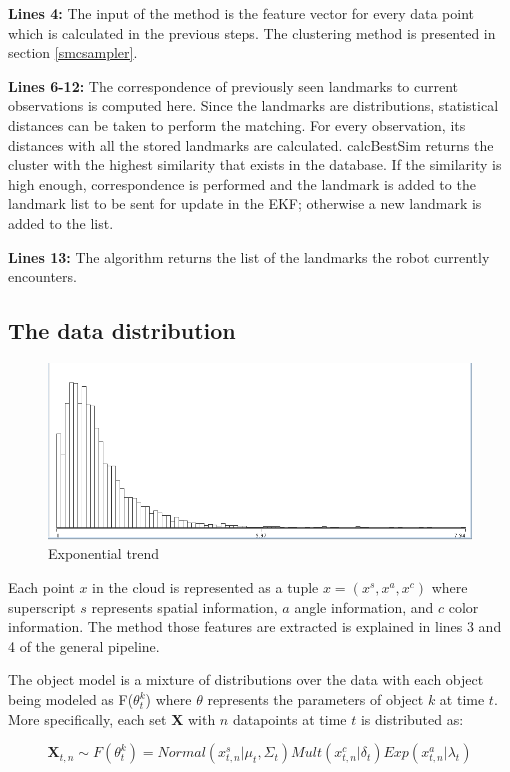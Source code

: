 \documentclass[twoside,hidelinks]{article}
\begin{document}
\textbf{Lines 4:} The input of the method is the feature vector for every data point which is calculated in the previous steps. The clustering method is presented in section \ref{smcsampler}. 

\textbf{Lines 6-12:} The correspondence of previously seen landmarks to current observations is computed here. Since the landmarks are distributions, statistical distances can be taken to perform the matching. For every observation, its distances with all the stored landmarks are calculated. calcBestSim returns the cluster with the highest similarity that exists in the database. If the similarity is high enough, correspondence is performed and the landmark is added to the landmark list to be sent for update in the EKF; otherwise a new landmark is added to the list.

\textbf{Lines 13:} The algorithm returns the list of the landmarks the robot currently encounters.

\subsection{The data distribution}
\label{data:dist}

\begin{figure}
    \centering
    \includegraphics[width=.35\textwidth]{Kullback-Leibler}
    \caption{Exponential trend}
    \label{pcl:kl}
\end{figure}

Each point $x$ in the cloud is represented as a tuple $x =(x^s, x^a, x^c ) $ where superscript $s$ represents spatial information, $a$ angle information, and $c$ color information. The method those features are extracted is explained in lines 3 and 4 of the general pipeline.

The object model is a mixture of distributions over the data with each object being modeled as F($\theta_t^k$) where $\theta$ represents the parameters of object $k$ at time $t$. More specifically, each set \textbf{X} with $n$ datapoints at time $t$ is distributed as:

\begin{equation}
    \textbf{X}_{t,n} \sim F(\theta_t^k) = Normal(x_{t,n}^s| \mu_t, \Sigma_t) Mult(x_{t,n}^c | \delta_t) Exp(x_{t,n}^a | \lambda_t) 
\end{equation}
\end{document}
